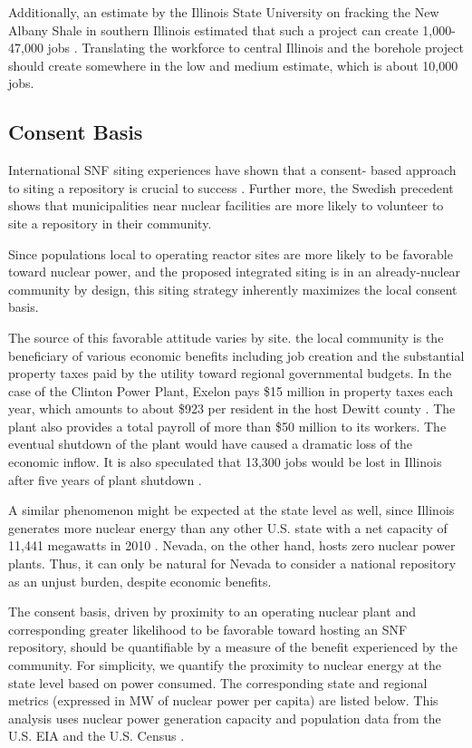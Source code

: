 Additionally, an estimate by the Illinois State University on fracking the New Albany
Shale in southern Illinois estimated that such a project can create 1,000-47,000 jobs
\cite{Loomis_2012}. Translating the workforce to central Illinois and the borehole
project should create somewhere in the low and medium estimate, which is about 10,000
jobs.   


\subsection{Consent Basis}
International \gls{SNF} siting experiences have shown that a consent-
based approach to siting a repository is crucial to success
\cite{ayers_blue_2012,doe_designing_2016,jenkins-smith_public_2013,freeze_siting_2015}. 
Further more, the Swedish precedent \cite{olsson_experience_2013} shows that 
municipalities near nuclear facilities
are more likely to volunteer to site a repository in their community.

Since populations local to operating reactor sites are more likely to be 
favorable toward nuclear power, and the proposed integrated siting 
is in an already-nuclear community by design, this siting strategy inherently 
maximizes the local consent basis.

The source of this favorable attitude varies by site. 
the local community is the beneficiary of various economic benefits
including job creation and the substantial property taxes paid by the utility 
toward regional governmental budgets.   In the case of the Clinton Power Plant, 
Exelon pays \$15 million in property taxes each year, which amounts to about 
\$923 per resident in the host Dewitt county \cite{Brady-Lunny_2016}. The plant
also provides a total payroll of more than \$50 million to its workers.
The eventual shutdown of the plant would have caused a dramatic loss of the economic inflow.
It is also speculated that 13,300 jobs would be lost in Illinois after five years 
of plant shutdown \cite{Reid_2014}.  

A similar phenomenon might be expected at the state level as well, since 
Illinois generates more nuclear energy than any other U.S.  state with a net 
capacity of 11,441 megawatts in 2010 \cite{EIA_2010}. Nevada, on the other 
hand, hosts zero nuclear power plants. Thus, it can only be natural for Nevada 
to consider a national repository as an unjust burden, despite economic 
benefits.  

The consent basis, driven by proximity to an operating nuclear plant and 
corresponding greater likelihood to be favorable toward hosting an \gls{SNF} 
repository, should be quantifiable by a measure of the benefit experienced by 
the community.  For simplicity, we quantify the proximity to nuclear energy at 
the state level  based on power consumed. The corresponding state and regional 
metrics (expressed in MW of nuclear power per capita) are listed below. This 
analysis uses nuclear power generation capacity and population data from the 
U.S. \gls{EIA} \cite{EIA_2010} and the U.S. Census \cite{census}.  

